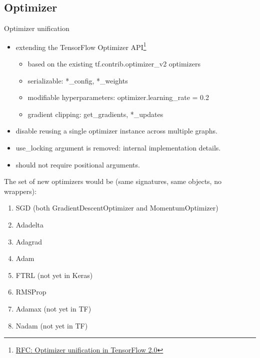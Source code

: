 
\subsection{Optimizer}

\begin{frame}{Optimizer unification}
    \begin{itemize}
        \item extending the TensorFlow Optimizer API\footnote{\href{https://github.com/tensorflow/community/pull/24}{RFC: Optimizer unification in TensorFlow 2.0}}
            \begin{itemize}
                \item based on the existing tf.contrib.optimizer\_v2 optimizers
                \item serializable: *\_config, *\_weights
                \item modifiable hyperparameters: optimizer.learning\_rate = 0.2
                \item gradient clipping: get\_gradients, *\_updates
            \end{itemize}
        \item disable reusing a single optimizer instance across multiple graphs.
        \item use\_locking argument is removed: internal implementation details.
        \item should not require positional arguments.
    \end{itemize}
\end{frame}

\begin{frame}
	The set of new optimizers would be (same signatures, same objects, no wrappers):
    \begin{enumerate}
    	\item SGD (both GradientDescentOptimizer and MomentumOptimizer)
    	\item Adadelta
    	\item Adagrad
    	\item Adam
    	\item FTRL (not yet in Keras)
    	\item RMSProp
    	\item Adamax (not yet in TF)
    	\item Nadam (not yet in TF)
    \end{enumerate}
\end{frame}
